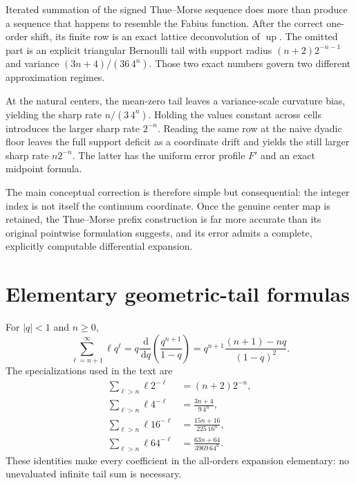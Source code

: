 \documentclass[11pt,oneside]{article}
\theoremstyle{definition}
\theoremstyle{remark}
\newcommand{\Up}{\operatorname{up}}
\newcommand{\dd}{\,\mathrm d}
\begin{document}
Iterated summation of the signed Thue--Morse sequence does more than produce a sequence that
happens to resemble the Fabius function.  After the correct one-order shift, its finite row is
an exact lattice deconvolution of $\Up$.  The omitted part is an explicit triangular Bernoulli
tail with support radius $(n+2)2^{-n-1}$ and variance $(3n+4)/(36\,4^n)$.  Those two exact
numbers govern two different approximation regimes.

At the natural centers, the mean-zero tail leaves a variance-scale curvature bias, yielding
the sharp rate $n/(3\,4^n)$.  Holding the values constant across cells introduces the larger
sharp rate $2^{-n}$.  Reading the same row at the naive dyadic floor leaves the full support
deficit as a coordinate drift and yields the still larger sharp rate $n2^{-n}$.  The latter
has the uniform error profile $F'$ and an exact midpoint formula.

The main conceptual correction is therefore simple but consequential: the integer index is
not itself the continuum coordinate.  Once the genuine center map is retained, the
Thue--Morse prefix construction is far more accurate than its original pointwise formulation
suggests, and its error admits a complete, explicitly computable differential expansion.

\appendix

\section{Elementary geometric-tail formulas}
\label{app:tails}

For $|q|<1$ and $n\ge0$,
\begin{equation}
 \sum_{\ell=n+1}^{\infty}\ell q^\ell
 =q\frac{\dd}{\dd q}\left(\frac{q^{n+1}}{1-q}\right)
 =q^{n+1}\frac{(n+1)-nq}{(1-q)^2}.                        \label{eq:geometric-tail}
\end{equation}
The specializations used in the text are
\begin{align}
 \sum_{\ell>n}\ell2^{-\ell}&=(n+2)2^{-n},\\
 \sum_{\ell>n}\ell4^{-\ell}&=\frac{3n+4}{9\,4^n},\\
 \sum_{\ell>n}\ell16^{-\ell}&=\frac{15n+16}{225\,16^n},\\
 \sum_{\ell>n}\ell64^{-\ell}&=\frac{63n+64}{3969\,64^n}.
\end{align}
These identities make every coefficient in the all-orders expansion elementary: no
unevaluated infinite tail sum is necessary.
\end{document}

